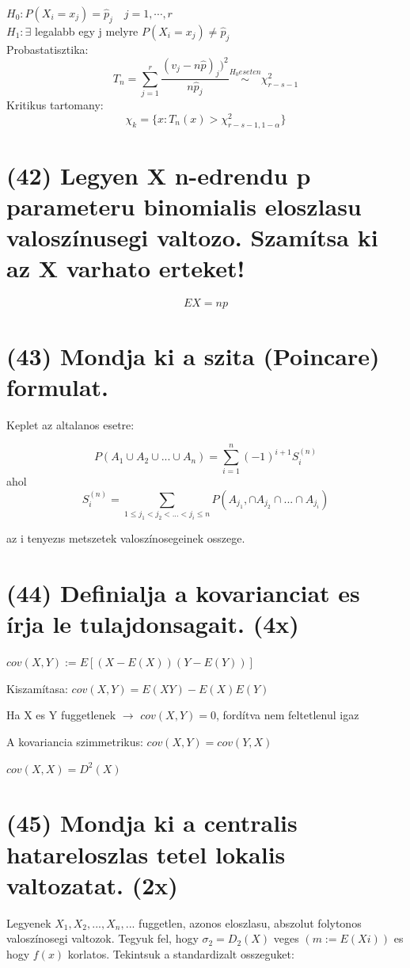 \documentclass[12p]{article}
\begin{document}
$H_0 : P(X_i = x_j) = \hat{p}_j \quad j=1,\cdots,r$\\
$H_1 : \exists$ legalabb egy j melyre $P(X_i = x_j) \neq \hat{p}_j$\\
Probastatisztika: $$T_n = \sum^r_{j=1} \frac{(v_j - n\hat{p})_j)^2}{n\hat{p}_j} \stackrel{H_0 eseten}{\sim} \chi^2_{r-s-1}$$
Kritikus tartomany: $$\chi_k = \{x: T_n(x) > \chi^2_{r-s-1,1-\alpha}\}$$

\section{(42) Legyen X n-edrendu p parameteru binomialis eloszlasu valoszínusegi valtozo. Szamítsa ki az X varhato erteket!}

$$EX = np$$

\section{(43) Mondja ki a szita (Poincare) formulat.}

Keplet az altalanos esetre:

$$P(A_1 \cup A_2 \cup ... \cup A_n) = \sum^n_{i=1} (-1)^{i+1} S^{(n)}_i$$
ahol
$$S^{(n)}_i = \sum_{1 \leq j_1 < j_2 < ... < j_i \leq n} P(A_{j_1}, \cap A_{j_2} \cap ... \cap A_{j_i})$$

az i tenyezıs metszetek
valoszínosegeinek osszege.

\section{(44) Definialja a kovarianciat es írja le tulajdonsagait. (4x)}

$cov(X,Y) := E[(X-E(X))(Y-E(Y))]$

Kiszamítasa:
$cov(X,Y) = E(XY)-E(X)E(Y)$

Ha X es Y fuggetlenek $\rightarrow$ $cov(X,Y) = 0$, fordítva nem feltetlenul igaz

A kovariancia szimmetrikus: $cov(X,Y) = cov(Y,X)$

$cov(X,X) = D^2(X)$

\section{(45) Mondja ki a centralis hatareloszlas tetel lokalis valtozatat. (2x)}

Legyenek $X_1 , X_2 ,..., X_n ,...$ fuggetlen, azonos eloszlasu, abszolut folytonos valoszínosegi valtozok. Tegyuk fel, hogy $\sigma_2=D_2(X)$ veges $(m:=E(Xi))$ es hogy $f(x)$ korlatos. Tekintsuk a standardizalt osszeguket:
\end{document}
